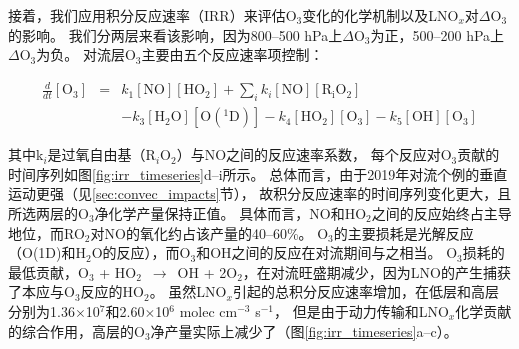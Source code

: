 接着，我们应用积分反应速率（IRR）来评估O$_3$变化的化学机制以及LNO$_x$对$\Delta$O$_3$的影响。
我们分两层来看该影响，因为800--500 hPa上$\Delta$O$_3$为正，500--200 hPa上$\Delta$O$_3$为负。
对流层O$_3$主要由五个反应速率项控制\citep{Pickering.1990}：

\begin{eqnarray}
  \frac{d}{dt}[\mathrm{O_3}] & = & k_1[\mathrm{NO}][\mathrm{HO_2}] + \sum_{i}  k_i[\mathrm{NO}][\mathrm{R_iO_2}] \nonumber \\
                             && - k_3[\mathrm{H_2O}][\mathrm{O(^1D)}] - k_4[\mathrm{HO_2}][\mathrm{O_3}] - k_5[\mathrm{OH}][\mathrm{O_3}]
\end{eqnarray}

其中k$_i$是过氧自由基（R$_i$O$_2$）与NO之间的反应速率系数，
每个反应对O$_3$贡献的时间序列如图\ref{fig:irr_timeseries}d--i所示。
总体而言，由于2019年对流个例的垂直运动更强（见\ref{sec:convec_impacts}节），
故积分反应速率的时间序列变化更大，且所选两层的O$_3$净化学产量保持正值。
具体而言，NO和HO$_2$之间的反应始终占主导地位，而RO$_2$对NO的氧化约占该产量的40--60\%。
O$_3$的主要损耗是光解反应（O(1D)和H$_2$O的反应），而O$_3$和OH之间的反应在对流期间与之相当。
O$_3$损耗的最低贡献，O$_3$ + HO$_2$ $\,\to\,$ OH + 2O$_2$，在对流旺盛期减少，因为LNO的产生捕获了本应与O$_3$反应的HO$_2$。
虽然LNO$_x$引起的总积分反应速率增加，在低层和高层分别为1.36$\times$10$^7$和2.60$\times$10$^6$ molec cm$^{-3}$ s$^{-1}$，
但是由于动力传输和LNO$_x$化学贡献的综合作用，高层的O$_3$净产量实际上减少了（图\ref{fig:irr_timeseries}a--c）。


